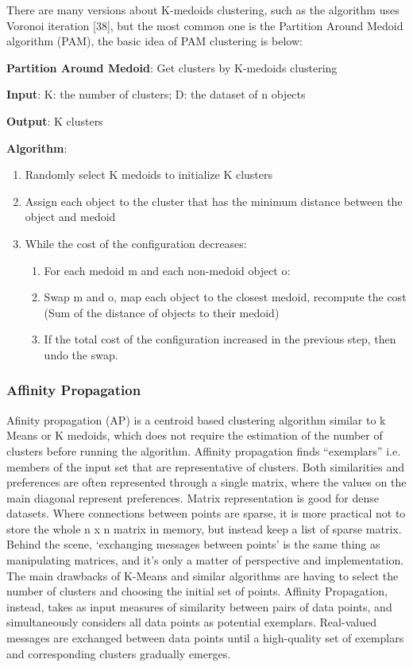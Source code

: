 \documentclass[a4paper, 12pt]{article}
\begin{document}
There are many versions about K-medoids clustering, such as the algorithm uses Voronoi iteration [38], but the most common one is the Partition Around Medoid algorithm (PAM), the basic idea of PAM clustering is below:

\textbf{Partition Around Medoid}: Get clusters by K-medoids clustering

\textbf{Input}: K: the number of clusters; D: the dataset of n objects

\textbf{Output}: K clusters

\textbf{Algorithm}:

\begin{enumerate}
    \item Randomly select K medoids to initialize K clusters
    \item Assign each object to the cluster that has the minimum distance between the object and medoid
    \item While the cost of the configuration decreases:
    \begin{enumerate}
        \item For each medoid m and each non-medoid object o:
        \item Swap m and o, map each object to the closest medoid, recompute the cost (Sum of the distance of objects to their medoid)
        \item If the total cost of the configuration increased in the previous step, then undo the swap.
    \end{enumerate}
\end{enumerate}


\subsubsection{Affinity Propagation}
Afinity propagation (AP) is a centroid based clustering algorithm similar to k Means or K medoids, which does not require the estimation of the number of clusters before running the algorithm. Affinity propagation finds “exemplars” i.e. members of the input set that are representative of clusters.
Both similarities and preferences are often represented through a single matrix, where the values on the main diagonal represent preferences. Matrix representation is good for dense datasets. Where connections between points are sparse, it is more practical not to store the whole n x n matrix in memory, but instead keep a list of sparse matrix. Behind the scene, ‘exchanging messages between points’ is the same thing as manipulating matrices, and it’s only a matter of perspective and implementation.
The main drawbacks of K-Means and similar algorithms are having to select the number of clusters and choosing the initial set of points. Affinity Propagation, instead, takes as input measures of similarity between pairs of data points, and simultaneously considers all data points as potential exemplars. Real-valued messages are exchanged between data points until a high-quality set of exemplars and corresponding clusters gradually emerges.
\end{document}

